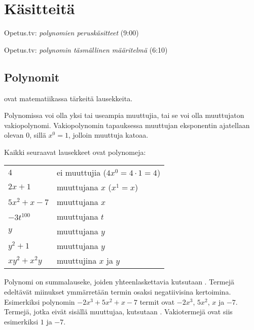 \section{Käsitteitä}

{Opetus.tv: \emph{polynomien peruskäsitteet} (9:00)}

{Opetus.tv: \emph{polynomin täsmällinen määritelmä} (6:10)}

\subsection*{Polynomit}

 ovat matematiikassa tärkeitä lausekkeita.


Polynomissa voi olla yksi tai useampia muuttujia, tai se voi olla muuttujaton vakiopolynomi. Vakiopolynomin tapauksessa muuttujan eksponentin ajatellaan olevan $0$, sillä $x^0=1$, jolloin muuttuja katoaa.

\begin{esimerkki}
Kaikki seuraavat lausekkeet ovat polynomeja:

\begin{tabular}{ll}
$4$ &  ei muuttujia ($4x^0=4 \cdot 1=4$)\\
$2x+1$ &  muuttujana $x$ ($x^1=x$)\\
$5x^2+x-7$ &   muuttujana $x$\\
$-3t^{100}$& muuttujana $t$\\
$y$& muuttujana $y$\\
$y^2+1$& muuttujana $y$\\
$xy^2+x^2y$& muuttujina $x$ ja $y$
\end{tabular}

\end{esimerkki}

Polynomi on summalauseke, joiden yhteenlaskettavia kutsutaan . Termejä edeltävät miinukset ymmärretään termin osaksi negatiivisina kertoimina. Esimerkiksi polynomin $-2x^3+5x^2+x-7$ termit ovat $-2x^3$, $5x^2$, $x$ ja $-7$. Termejä, jotka eivät sisällä muuttujaa, kutsutaan  . Vakiotermejä ovat siis esimerkiksi $1$ ja $-7$.

